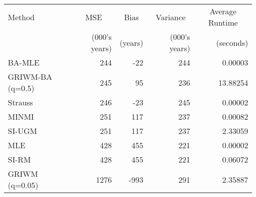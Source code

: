 
\begin{tabular}{lrrrr}
\toprule
\multicolumn{1}{l}{Method} & \multicolumn{1}{c}{MSE} & \multicolumn{1}{c}{Bias} & \multicolumn{1}{c}{Variance} & \multicolumn{1}{c}{Average Runtime} \\
 & (000's years) & (years) & (000's years) & (seconds)\\
\midrule
BA-MLE & 244 & -22 & 244 & 0.00003\\
GRIWM-BA (q=0.5) & 245 & 95 & 236 & 13.88254\\
Strauss & 246 & -23 & 245 & 0.00002\\
MINMI & 251 & 117 & 237 & 0.00082\\
SI-UGM & 251 & 117 & 237 & 2.33059\\
\addlinespace
MLE & 428 & 455 & 221 & 0.00002\\
SI-RM & 428 & 455 & 221 & 0.06072\\
GRIWM (q=0.05) & 1276 & -993 & 291 & 2.35887\\
\bottomrule
\end{tabular}
